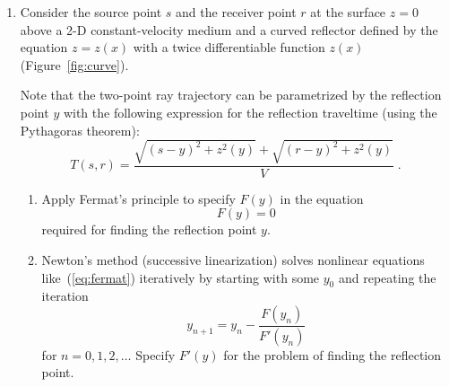 \begin{enumerate}

\item Consider the source point $s$ and the receiver point $r$ at the
  surface $z=0$ above a 2-D constant-velocity medium and a curved
  reflector defined by the equation $z = z(x)$ with a twice
  differentiable function $z(x)$ (Figure~\ref{fig:curve}).


  Note that the two-point ray trajectory can be parametrized by the
  reflection point $y$ with the following expression for the
  reflection traveltime (using the Pythagoras theorem):
  \begin{equation}
    \label{eq:dsr}
      T(s,r) = \frac{\sqrt{(s-y)^2+z^2(y)}+\sqrt{(r-y)^2+z^2(y)}}{V}\;.
  \end{equation}

  \begin{enumerate}
  \item Apply Fermat's principle to specify $F(y)$ in the equation
    \begin{equation}
	\label{eq:fermat}
	    F(y) = 0
      \end{equation}
      required for finding the reflection point $y$.
      \item Newton's method (successive linearization) solves nonlinear
    equations like~(\ref{eq:fermat}) iteratively by starting with some
    $y_0$ and repeating the iteration
      \begin{equation}
      \label{eq:newton}
        y_{n+1} = y_n - \frac{F(y_n)}{F'(y_n)}
      \end{equation}
      for $n=0,1,2,\ldots$ Specify $F'(y)$ for the problem of finding the reflection point.


\end{enumerate}
\end{enumerate}
